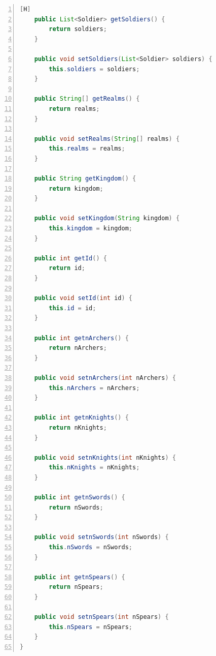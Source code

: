 \documentclass{article}
\begin{document}
\begin{lstlisting}[language=java,caption={Clase Army}, numbers=left][H]
    public List<Soldier> getSoldiers() {
        return soldiers;
    }

    public void setSoldiers(List<Soldier> soldiers) {
        this.soldiers = soldiers;
    }

    public String[] getRealms() {
        return realms;
    }

    public void setRealms(String[] realms) {
        this.realms = realms;
    }

    public String getKingdom() {
        return kingdom;
    }

    public void setKingdom(String kingdom) {
        this.kingdom = kingdom;
    }

    public int getId() {
        return id;
    }

    public void setId(int id) {
        this.id = id;
    }

    public int getnArchers() {
        return nArchers;
    }

    public void setnArchers(int nArchers) {
        this.nArchers = nArchers;
    }

    public int getnKnights() {
        return nKnights;
    }

    public void setnKnights(int nKnights) {
        this.nKnights = nKnights;
    }

    public int getnSwords() {
        return nSwords;
    }

    public void setnSwords(int nSwords) {
        this.nSwords = nSwords;
    }

    public int getnSpears() {
        return nSpears;
    }

    public void setnSpears(int nSpears) {
        this.nSpears = nSpears;
    }
}

	\end{lstlisting}
	
\end{document}
